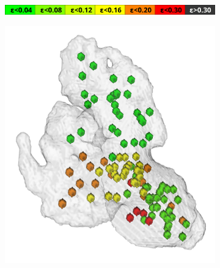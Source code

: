 \documentclass[review]{elsarticle}
\begin{document}
\begin{figure}[t]
  \centering
  \begin{subfigure}[b]{.6\linewidth}
    \centering
    \includegraphics[width=\textwidth]{fig16_legend.png}
  \end{subfigure}%


  \begin{subfigure}[b]{.18\linewidth}
    \centering
    \includegraphics[width=\textwidth]{fig16_1.png}
    \caption{}
  \end{subfigure}%
  \begin{subfigure}[b]{.17\linewidth}
    \centering

\end{subfigure}
\end{figure}
\end{document}
